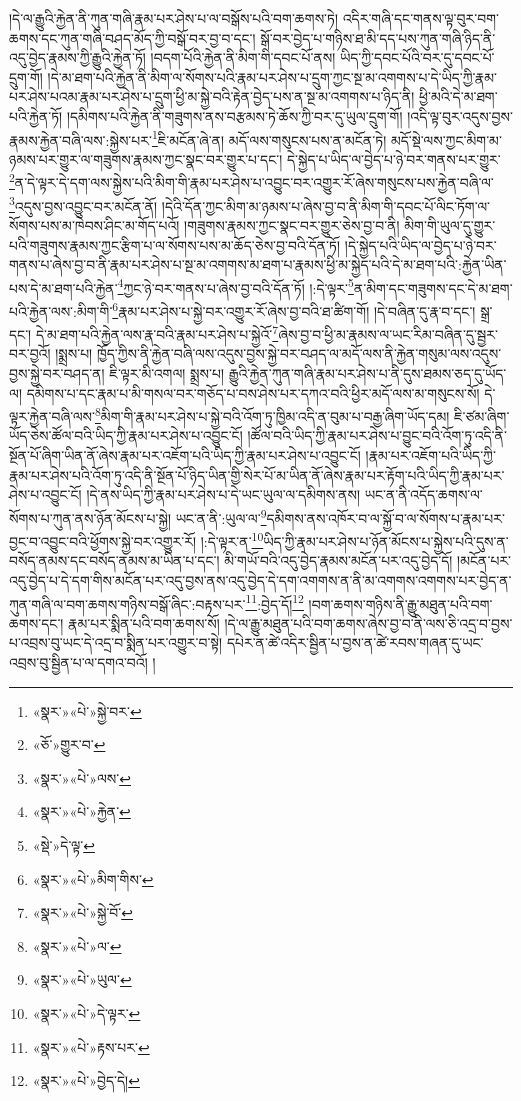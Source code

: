 །དེ་ལ་རྒྱུའི་རྐྱེན་ནི་ཀུན་གཞི་རྣམ་པར་ཤེས་པ་ལ་བསྒོས་པའི་བག་ཆགས་ཏེ། འདིར་གཞི་དང་གནས་ལྟ་བུར་བག་ཆགས་དང་ཀུན་གཞི་བཤད་མོད་ཀྱི་བསྒོ་བར་བྱ་བ་དང་། སྒོ་བར་བྱེད་པ་གཉིས་ཐ་མི་དད་པས་ཀུན་གཞི་ཉིད་ནི་འདུ་བྱེད་རྣམས་ཀྱི་རྒྱུའི་རྐྱེན་ཏོ། །བདག་པོའི་རྐྱེན་ནི་མིག་གི་དབང་པོ་ནས། ཡིད་ཀྱི་དབང་པོའི་བར་དུ་དབང་པོ་དྲུག་གོ། །དེ་མ་ཐག་པའི་རྐྱེན་ནི་མིག་ལ་སོགས་པའི་རྣམ་པར་ཤེས་པ་དྲུག་ཀྱང་སྔ་མ་འགགས་པ་དེ་ཡིད་ཀྱི་རྣམ་པར་ཤེས་པའམ་རྣམ་པར་ཤེས་པ་དྲུག་ཕྱི་མ་སྐྱེ་བའི་རྟེན་བྱེད་པས་ན་སྔ་མ་འགགས་པ་ཉིད་ནི། ཕྱི་མའི་དེ་མ་ཐག་པའི་རྐྱེན་ཏོ། །དམིགས་པའི་རྐྱེན་ནི་གཟུགས་ནས་བརྩམས་ཏེ་ཆོས་ཀྱི་བར་དུ་ཡུལ་དྲུག་གོ། །འདི་ལྟ་བུར་འདུས་བྱས་རྣམས་རྐྱེན་བཞི་ལས་:སྐྱེས་པར་\footnote{«སྣར་»«པེ་»སྐྱེ་བར་}ཇི་མངོན་ཞེ་ན། མདོ་ལས་གསུངས་པས་ན་མངོན་ཏེ། མདོ་སྡེ་ལས་ཀྱང་མིག་མ་ཉམས་པར་གྱུར་ལ་གཟུགས་རྣམས་ཀྱང་སྣང་བར་གྱུར་པ་དང་། དེ་སྐྱེད་པ་ཡིད་ལ་བྱེད་པ་ཉེ་བར་གནས་པར་གྱུར་\footnote{«ཅོ་»གྱུར་བ་}ན་དེ་ལྟར་དེ་དག་ལས་སྐྱེས་པའི་མིག་གི་རྣམ་པར་ཤེས་པ་འབྱུང་བར་འགྱུར་རོ་ཞེས་གསུངས་པས་རྐྱེན་བཞི་ལ་\footnote{«སྣར་»«པེ་»ལས་}འདུས་བྱས་འབྱུང་བར་མངོན་ནོ། །དེའི་དོན་ཀྱང་མིག་མ་ཉམས་པ་ཞེས་བྱ་བ་ནི་མིག་གི་དབང་པོ་ལིང་ཏོག་ལ་སོགས་པས་མ་ཁེབས་ཤིང་མ་གོད་པའོ། །གཟུགས་རྣམས་ཀྱང་སྣང་བར་གྱུར་ཅེས་བྱ་བ་ནི། མིག་གི་ཡུལ་དུ་གྱུར་པའི་གཟུགས་རྣམས་ཀྱང་རྩིག་པ་ལ་སོགས་པས་མ་ཆོད་ཅེས་བྱ་བའི་དོན་ཏོ། །དེ་སྐྱེད་པའི་ཡིད་ལ་བྱེད་པ་ཉེ་བར་གནས་པ་ཞེས་བྱ་བ་ནི་རྣམ་པར་ཤེས་པ་སྔ་མ་འགགས་མ་ཐག་པ་རྣམས་ཕྱི་མ་སྐྱེད་པའི་དེ་མ་ཐག་པའི་:རྐྱེན་ཡིན་པས་དེ་མ་ཐག་པའི་རྐྱེན་\footnote{«སྣར་»«པེ་»རྐྱེན་}ཀྱང་ཉེ་བར་གནས་པ་ཞེས་བྱ་བའི་དོན་ཏོ། །:དེ་ལྟར་\footnote{«སྡེ་»དེ་ལྟ་}ན་མིག་དང་གཟུགས་དང་དེ་མ་ཐག་པའི་རྐྱེན་ལས་:མིག་གི་\footnote{«སྣར་»«པེ་»མིག་གིས་}རྣམ་པར་ཤེས་པ་སྐྱེ་བར་འགྱུར་རོ་ཞེས་བྱ་བའི་ཐ་ཚིག་གོ། །དེ་བཞིན་དུ་རྣ་བ་དང་། སྒྲ་དང་། དེ་མ་ཐག་པའི་རྐྱེན་ལས་རྣ་བའི་རྣམ་པར་ཤེས་པ་སྐྱེའོ་\footnote{«སྣར་»«པེ་»སྐྱེ་བོ་}ཞེས་བྱ་བ་ཕྱི་མ་རྣམས་ལ་ཡང་རིམ་བཞིན་དུ་སྦྱར་བར་བྱའོ། །སྨྲས་པ། ཁྱོད་ཀྱིས་ནི་རྐྱེན་བཞི་ལས་འདུས་བྱས་སྐྱེ་བར་བཤད་ལ་མདོ་ལས་ནི་རྐྱེན་གསུམ་ལས་འདུས་བྱས་སྐྱེ་བར་བཤད་ན། ཇི་ལྟར་མི་འགལ། སྨྲས་པ། རྒྱུའི་རྐྱེན་ཀུན་གཞི་རྣམ་པར་ཤེས་པ་ནི་དུས་ཐམས་ཅད་དུ་ཡོད་ལ། དམིགས་པ་དང་རྣམ་པ་མི་གསལ་བར་གཅོད་པ་བས་ཤེས་པར་དཀའ་བའི་ཕྱིར་མདོ་ལས་མ་གསུངས་སོ། དེ་ལྟར་རྐྱེན་བཞི་ལས་\footnote{«སྣར་»«པེ་»ལ་}མིག་གི་རྣམ་པར་ཤེས་པ་སྐྱེ་བའི་འོག་ཏུ་ཁྱིམ་འདི་ན་བུམ་པ་བརྒྱ་ཞིག་ཡོད་དམ། ཇི་ཙམ་ཞིག་ཡོད་ཅེས་ཚོལ་བའི་ཡིད་ཀྱི་རྣམ་པར་ཤེས་པ་འབྱུང་ངོ། །ཚོལ་བའི་ཡིད་ཀྱི་རྣམ་པར་ཤེས་པ་བྱུང་བའི་འོག་ཏུ་འདི་ནི་སྔོན་པོ་ཞིག་ཡིན་ནོ་ཞེས་རྣམ་པར་འཇོག་པའི་ཡིད་ཀྱི་རྣམ་པར་ཤེས་པ་འབྱུང་ངོ། །རྣམ་པར་འཇོག་པའི་ཡིད་ཀྱི་རྣམ་པར་ཤེས་པའི་འོག་ཏུ་འདི་ནི་སྔོན་པོ་ཉིད་ཡིན་གྱི་སེར་པོ་མ་ཡིན་ནོ་ཞེས་རྣམ་པར་རྟོག་པའི་ཡིད་ཀྱི་རྣམ་པར་ཤེས་པ་འབྱུང་ངོ། །དེ་ནས་ཡིད་ཀྱི་རྣམ་པར་ཤེས་པ་དེ་ཡང་ཡུལ་ལ་དམིགས་ནས། ཡང་ན་ནི་འདོད་ཆགས་ལ་སོགས་པ་ཀུན་ནས་ཉོན་མོངས་པ་སྐྱེ། ཡང་ན་ནི་:ཡུལ་ལ་\footnote{«སྣར་»«པེ་»ཡུལ་}དམིགས་ནས་འཁོར་བ་ལ་སྐྱོ་བ་ལ་སོགས་པ་རྣམ་པར་བྱང་བ་འབྱུང་བའི་ཕྱོགས་སྐྱེ་བར་འགྱུར་རོ། །:དེ་ལྟར་ན་\footnote{«སྣར་»«པེ་»དེ་ལྟར་}ཡིད་ཀྱི་རྣམ་པར་ཤེས་པ་ཉོན་མོངས་པ་སྐྱེས་པའི་དུས་ན་བསོད་ནམས་དང་བསོད་ནམས་མ་ཡིན་པ་དང་། མི་གཡོ་བའི་འདུ་བྱེད་རྣམས་མངོན་པར་འདུ་བྱེད་དོ། །མངོན་པར་འདུ་བྱེད་པ་དེ་དག་གིས་མངོན་པར་འདུ་བྱས་ནས་འདུ་བྱེད་དེ་དག་འགགས་ན་ནི་མ་འགགས་འགགས་པར་བྱེད་ན་ཀུན་གཞི་ལ་བག་ཆགས་གཉིས་བསྒོ་ཞིང་:བརྟས་པར་\footnote{«སྣར་»«པེ་»རྟས་པར་}:བྱེད་དོ།\footnote{«སྣར་»«པེ་»བྱེད་དེ།} །བག་ཆགས་གཉིས་ནི་རྒྱུ་མཐུན་པའི་བག་ཆགས་དང་། རྣམ་པར་སྨིན་པའི་བག་ཆགས་སོ། །དེ་ལ་རྒྱུ་མཐུན་པའི་བག་ཆགས་ཞེས་བྱ་བ་ནི་ལས་ཅི་འདྲ་བ་བྱས་པ་འབྲས་བུ་ཡང་དེ་འདྲ་བ་སྨིན་པར་འགྱུར་བ་སྟེ། དཔེར་ན་ཚེ་འདིར་སྦྱིན་པ་བྱས་ན་ཚེ་རབས་གཞན་དུ་ཡང་འབྲས་བུ་སྦྱིན་པ་ལ་དགའ་བའོ། །
